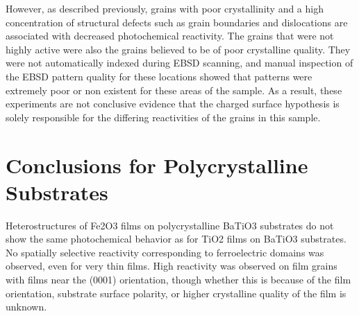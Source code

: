 \documentclass[12pt,%
              twoside,
               letterpaper]{uiothesis}
\begin{document}
However, as described previously, grains with poor crystallinity and a high concentration of structural defects such as grain boundaries and dislocations are associated with decreased photochemical reactivity. The grains that were not highly active were also the grains believed to be of poor crystalline quality. They were not automatically indexed during EBSD scanning, and manual inspection of the EBSD pattern quality for these locations showed that patterns were extremely poor or non existent for these areas of the sample. As a result, these experiments are not conclusive evidence that the charged surface hypothesis is solely responsible for the differing reactivities of the grains in this sample. 


\section{Conclusions for Polycrystalline Substrates}
\label{sec:ch6conclusions}



Heterostructures of Fe2O3 films on polycrystalline BaTiO3 substrates do not show the same photochemical behavior as for TiO2 films on BaTiO3 substrates. No spatially selective reactivity corresponding to ferroelectric domains was observed, even for very thin films. High reactivity was observed on film grains with films near the (0001) orientation, though whether this is because of the film orientation, substrate surface polarity, or higher crystalline quality of the film is unknown.

%       
%       
%       
      
   
   
     


 
\end{document}
